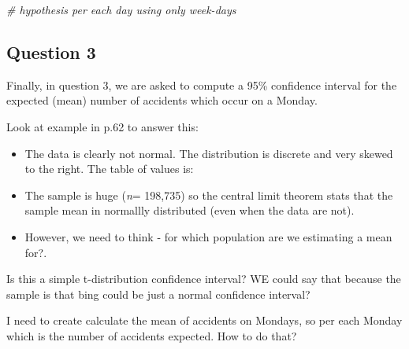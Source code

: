 \documentclass[]{article}
\newenvironment{Shaded}{\begin{snugshade}}{\end{snugshade}}
\newcommand{\KeywordTok}[1]{\textcolor[rgb]{0.13,0.29,0.53}{\textbf{{#1}}}}
\newcommand{\DataTypeTok}[1]{\textcolor[rgb]{0.13,0.29,0.53}{{#1}}}
\newcommand{\StringTok}[1]{\textcolor[rgb]{0.31,0.60,0.02}{{#1}}}
\newcommand{\CommentTok}[1]{\textcolor[rgb]{0.56,0.35,0.01}{\textit{{#1}}}}
\newcommand{\NormalTok}[1]{{#1}}
\begin{document}
\begin{Shaded}
\begin{Highlighting}[]
\CommentTok{# hypothesis per each day using only week-days}
\end{Highlighting}
\end{Shaded}

\subsection{Question 3}\label{question-3}

Finally, in question 3, we are asked to compute a 95\% confidence
interval for the expected (mean) number of accidents which occur on a
Monday.

Look at example in p.62 to answer this:

\begin{itemize}
\item
  The data is clearly not normal. The distribution is discrete and very
  skewed to the right. The table of values is:
\item
  The sample is huge (\emph{n}= 198,735) so the central limit theorem
  stats that the sample mean in normallly distributed (even when the
  data are not).
\item
  However, we need to think - for which population are we estimating a
  mean for?.
\end{itemize}

Is this a simple t-distribution confidence interval? WE could say that
because the sample is that bing could be just a normal confidence
interval?

I need to create calculate the mean of accidents on Mondays, so per each
Monday which is the number of accidents expected. How to do that?

\begin{Shaded}
\end{Shaded}

\begin{Shaded}
\end{Shaded}
\end{document}
